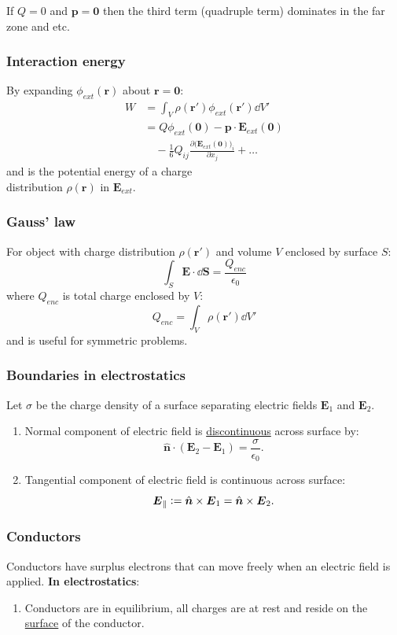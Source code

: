 \documentclass{article}
\newcommand{\deq}{\vcentcolon=}
\newcommand{\vc}[1]{\boldsymbol{#1}}
\begin{document}
\begin{multicols*}{3}
If $Q=0$ and $\vc{p}=\vc{0}$ then
the third term (quadruple term)
dominates in the far zone and etc.

\subsubsection*{Interaction energy}
By expanding $\phi_{ext}(\vc{r})$ about $\vc{r}=\vc{0}$:
\begin{align*}
    W
    &=\int_V\rho(\vc{r}')\phi_{ext}(\vc{r}')\dd V' \\
    &=Q\phi_{ext}(\vc{0})-\vc{p}\cdot\vc{E}_{ext}(\vc{0}) \\
    &\quad-\frac{1}{6}Q_{ij}\frac{\partial
    \big(\vc{E}_{ext}(\vc{0})\big)_i}
    {\partial x_j}+\dots
\end{align*}
and is the potential energy of a charge \\
distribution $\rho(\vc{r})$ in $\vc{E}_{ext}$.

\newcolumn

\subsubsection*{Gauss' law}
For object with charge distribution
$\rho(\vc{r}')$ and volume $V$ enclosed by surface $S$:
$$\int_S\vc{E}\cdot\dd\vc{S}=\frac{Q_{enc}}{\epsilon_0}$$
where $Q_{enc}$ is total charge enclosed by $V$:
$$Q_{enc}=\int_V\rho(\vc{r}')\dd V'$$
and is useful for symmetric problems.

\subsubsection*{Boundaries in electrostatics}
Let $\sigma$ be the charge density of a surface
separating electric fields $\vc{E}_1$ and $\vc{E}_2$.
\begin{enumerate}
    \item Normal component of electric field is
    \underline{discontinuous} across surface by:
    $$\hat{\vc{n}}\cdot(\vc{E}_2-\vc{E}_1)
    =\frac{\sigma}{\epsilon_0}.$$

    \item Tangential component of electric
    field is continuous across surface:
    $$\vc{E}_{\parallel}\deq\hat{\vc{n}}\times\vc{E}_1
    =\hat{\vc{n}}\times\vc{E}_2.$$
\end{enumerate}

\subsubsection*{Conductors}
Conductors have surplus electrons that can move freely
when an electric field is applied. 
\textbf{In electrostatics}:
\begin{enumerate}
    \item Conductors are in equilibrium,
    all charges are at rest and reside on the
    \underline{surface} of the conductor.


\end{enumerate}
\end{multicols*}
\end{document}
